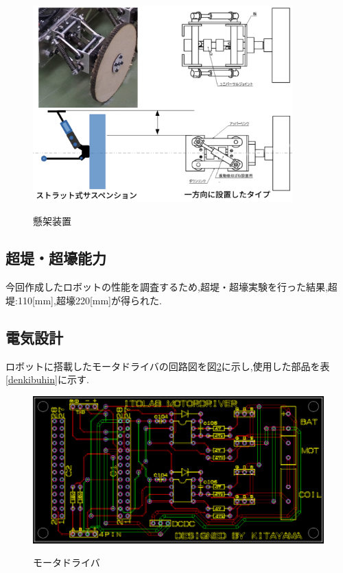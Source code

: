 \documentclass[12pt,oneside]{sotsuken_paper}
\begin{document}
\begin{figure}[htp]
 \begin{center}
  \includegraphics[width=100mm]{img/hard/3.png}
 　\caption{懸架装置}
  \label{fig:kenka}%
 \end{center}
\end{figure}


\subsection{超堤・超壕能力}
今回作成したロボットの性能を調査するため,超堤・超壕実験を行った結果,超堤:110[mm],超壕220[mm]が得られた.

\subsection{電気設計}
ロボットに搭載したモータドライバの回路図を図\ref{fig:denkikairo}に示し,使用した部品を表\ref{denkibuhin}に示す.

\begin{figure}[htp]
 \begin{center}
  \includegraphics[width=150mm]{img/hard/denkikairo.png}
 　\caption{モータドライバ}
  \label{fig:denkikairo}%
 \end{center}
\end{figure}
\end{document}

